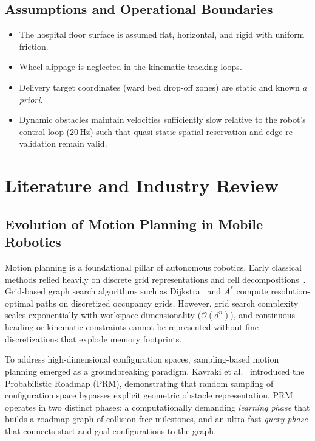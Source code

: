 \documentclass[12pt,a4paper]{article}
\begin{document}
\subsection{Assumptions and Operational Boundaries}
\begin{itemize}[itemsep=2pt,topsep=2pt]
\item The hospital floor surface is assumed flat, horizontal, and rigid with uniform friction.
\item Wheel slippage is neglected in the kinematic tracking loops.
\item Delivery target coordinates (ward bed drop-off zones) are static and known \textit{a priori}.
\item Dynamic obstacles maintain velocities sufficiently slow relative to the robot's control loop ($20\,\text{Hz}$) such that quasi-static spatial reservation and edge re-validation remain valid.
\end{itemize}

\section{Literature and Industry Review}

\subsection{Evolution of Motion Planning in Mobile Robotics}
Motion planning is a foundational pillar of autonomous robotics. Early classical methods relied heavily on discrete grid representations and cell decompositions~\cite{russell2010}. Grid-based graph search algorithms such as Dijkstra~\cite{hart1968} and $A^*$ compute resolution-optimal paths on discretized occupancy grids. However, grid search complexity scales exponentially with workspace dimensionality ($\mathcal{O}(d^n)$), and continuous heading or kinematic constraints cannot be represented without fine discretizations that explode memory footprints.

To address high-dimensional configuration spaces, sampling-based motion planning emerged as a groundbreaking paradigm. Kavraki et al.~\cite{kavraki1996} introduced the Probabilistic Roadmap (PRM), demonstrating that random sampling of configuration space bypasses explicit geometric obstacle representation. PRM operates in two distinct phases: a computationally demanding \textit{learning phase} that builds a roadmap graph of collision-free milestones, and an ultra-fast \textit{query phase} that connects start and goal configurations to the graph.
\end{document}
